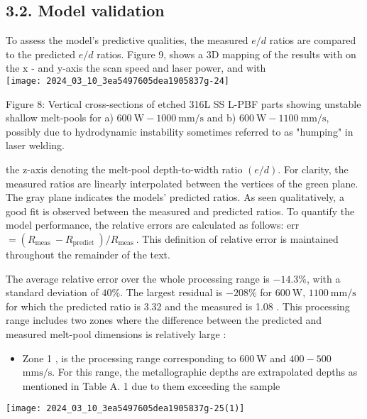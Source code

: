 \documentclass[10pt]{article}
\begin{document}
\subsection*{3.2. Model validation}
To assess the model's predictive qualities, the measured $e / d$ ratios are compared to the predicted $e / d$ ratios. Figure 9, shows a 3D mapping of the results with on the $\mathrm{x}$ - and $\mathrm{y}$-axis the scan speed and laser power, and with\\
\texttt{[image: 2024\_03\_10\_3ea5497605dea1905837g-24]}

Figure 8: Vertical cross-sections of etched 316L SS L-PBF parts showing unstable shallow melt-pools for a) $600 \mathrm{~W}-1000 \mathrm{~mm} / \mathrm{s}$ and b) $600 \mathrm{~W}-1100 \mathrm{~mm} / \mathrm{s}$, possibly due to hydrodynamic instability sometimes referred to as "humping" in laser welding.

the z-axis denoting the melt-pool depth-to-width ratio $(e / d)$. For clarity, the measured ratios are linearly interpolated between the vertices of the green plane. The gray plane indicates the models' predicted ratios. As seen qualitatively, a good fit is observed between the measured and predicted ratios. To quantify the model performance, the relative errors are calculated as follows: err $=\left(R_{\text {meas }}-R_{\text {predict }}\right) / R_{\text {meas }}$. This definition of relative error is maintained throughout the remainder of the text.

The average relative error over the whole processing range is $-14.3 \%$, with a standard deviation of $40 \%$. The largest residual is $-208 \%$ for $600 \mathrm{~W}$, $1100 \mathrm{~mm} / \mathrm{s}$ for which the predicted ratio is 3.32 and the measured is 1.08 . This processing range includes two zones where the difference between the predicted and measured melt-pool dimensions is relatively large :

\begin{itemize}
  \item Zone 1 , is the processing range corresponding to $600 \mathrm{~W}$ and $400-500$ $\mathrm{mms} / \mathrm{s}$. For this range, the metallographic depths are extrapolated depths as mentioned in Table A. 1 due to them exceeding the sample
\end{itemize}

\begin{center}
\texttt{[image: 2024\_03\_10\_3ea5497605dea1905837g-25(1)]}
\end{center}
\end{document}
